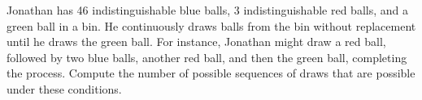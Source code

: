 Jonathan has 46 indistinguishable blue balls, $3$ indistinguishable red balls, and a green ball in a bin. He continuously draws balls from the bin without replacement until he draws the green ball. For instance, Jonathan might draw a red ball, followed by two blue balls, another red ball, and then the green ball, completing the process. Compute the number of possible sequences of draws that are possible under these conditions.
